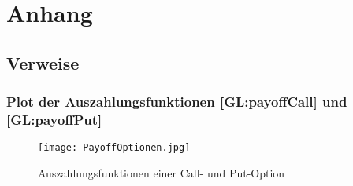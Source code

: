 \appendix 


\chapter{Anhang} 

\section{Verweise}                    %


\subsection{Plot der Auszahlungsfunktionen \ref{GL:payoffCall} und \ref{GL:payoffPut} \label{Anhang:PlotPayoff}}
\begin{figure}[h]
\texttt{[image: PayoffOptionen.jpg]}
\caption{Auszahlungsfunktionen einer Call- und Put-Option}
\end{figure}


